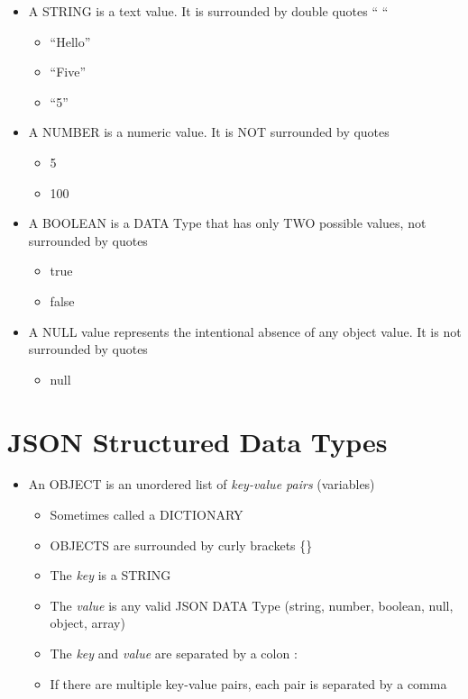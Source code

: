 \begin{itemize}
\tightlist
\item
  A STRING is a text value. It is surrounded by double quotes `` ``

  \begin{itemize}
  \tightlist
  \item
    ``Hello''
  \item
    ``Five''
  \item
    ``5''
  \end{itemize}
\item
  A NUMBER is a numeric value. It is NOT surrounded by quotes

  \begin{itemize}
  \tightlist
  \item
    5
  \item
    100
  \end{itemize}
\item
  A BOOLEAN is a DATA Type that has only TWO possible values, not
  surrounded by quotes

  \begin{itemize}
  \tightlist
  \item
    true
  \item
    false
  \end{itemize}
\item
  A NULL value represents the intentional absence of any object value.
  It is not surrounded by quotes

  \begin{itemize}
  \tightlist
  \item
    null
  \end{itemize}
\end{itemize}

\section{JSON Structured Data Types}\label{json-structured-data-types}

\begin{itemize}
\tightlist
\item
  An OBJECT is an unordered list of \emph{key-value pairs} (variables)

  \begin{itemize}
  \tightlist
  \item
    Sometimes called a DICTIONARY
  \item
    OBJECTS are surrounded by curly brackets \{\}
  \item
    The \emph{key} is a STRING
  \item
    The \emph{value} is any valid JSON DATA Type (string, number,
    boolean, null, object, array)
  \item
    The \emph{key} and \emph{value} are separated by a colon :
  \item
    If there are multiple key-value pairs, each pair is separated by a
    comma
  \end{itemize}
\end{itemize}

